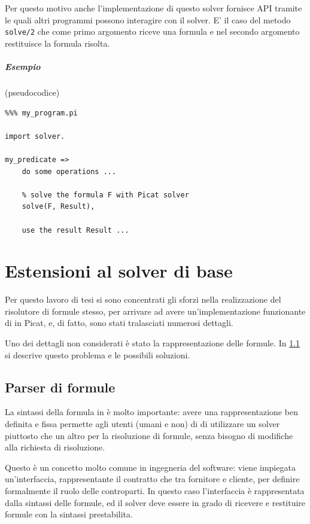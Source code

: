 \documentclass[12pt,a4paper,openright]{book} %
\begin{document}
Per questo motivo anche l'implementazione di questo solver fornisce API tramite le quali altri programmi possono interagire con il solver. E' il caso del metodo \verb|solve/2| che come primo argomento riceve una formula e nel secondo argomento restituisce la formula risolta.

\paragraph{Esempio} (pseudocodice)
\begin{verbatim}
%%% my_program.pi

import solver.

my_predicate =>
    do some operations ...

    % solve the formula F with Picat solver
    solve(F, Result),

    use the result Result ...
\end{verbatim}

\chapter{Estensioni al solver di base}
\label{ch:ext}

\minitoc

Per questo lavoro di tesi si sono concentrati gli sforzi nella realizzazione del risolutore di formule stesso, per arrivare ad avere un'implementazione funzionante di \lset{} in Picat, e, di fatto, sono stati tralasciati numerosi dettagli.

Uno dei dettagli non considerati è stato la rappresentazione delle formule. In \ref{sec:ext_formulas} si descrive questo problema e le possibili soluzioni.

\section{Parser di formule}
\label{sec:ext_formulas}

La sintassi della formula in \lset{} è molto importante: avere una rappresentazione ben definita e fissa permette agli utenti (umani e non) di \lset{} di utilizzare un solver piuttosto che un altro per la risoluzione di formule, senza bisogno di modifiche alla richiesta di risoluzione.

Questo è un concetto molto comune in ingegneria del software: viene impiegata un'interfaccia, rappresentante il contratto che tra fornitore e cliente, per definire formalmente il ruolo delle controparti. In questo caso l'interfaccia è rappresentata dalla sintassi delle formule, ed il solver deve essere in grado di ricevere e restituire formule con la sintassi prestabilita.
\end{document}
